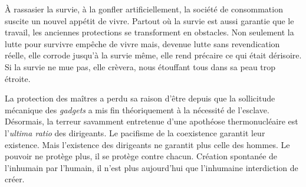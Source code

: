 \documentclass[french,twoside]{book} %
\begin{document}
À rassasier la survie, à la gonfler artificiellement, la société de consommation suscite un nouvel appétit de vivre. Partout où la survie est aussi garantie que le travail, les anciennes protections se transforment en obstacles. Non seulement la lutte pour survivre empêche de vivre mais, devenue lutte sans revendication réelle, elle corrode jusqu’à la survie même, elle rend précaire ce qui était dérisoire. Si la survie ne mue pas, elle crèvera, nous étouffant tous dans sa peau trop étroite.\par
La protection des maîtres a perdu sa raison d’être depuis que la sollicitude mécanique des \emph{gadgets} a mis fin théoriquement à la nécessité de l’esclave. Désormais, la terreur savamment entretenue d’une apothéose thermonucléaire est l’\emph{ultima ratio} des dirigeants. Le pacifisme de la coexistence garantit leur existence. Mais l’existence des dirigeants ne garantit plus celle des hommes. Le pouvoir ne protège plus, il se protège contre chacun. Création spontanée de l’inhumain par l’humain, il n’est plus aujourd’hui que l’inhumaine interdiction de créer.
\end{document}
